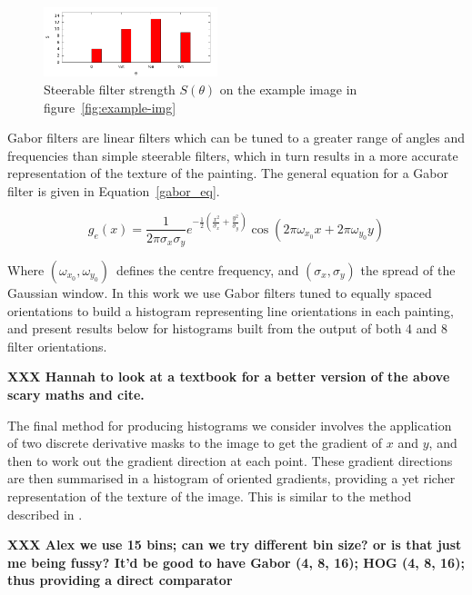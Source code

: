 \documentclass[conference,a4paper]{IEEEtran}
\begin{document}
\begin{figure}[h]
\centering
\includegraphics[width=0.45\textwidth]{img/steerable.pdf}
\caption{Steerable filter strength $S(\theta)$ on the example image in figure~\ref{fig:example-img}}
\end{figure}

Gabor filters are linear filters which can be tuned to a greater range of
angles and frequencies than simple steerable filters, which in turn results in
a more accurate representation of the texture of the painting. The general
equation for a Gabor filter is given in Equation~\ref{gabor_eq}.

\begin{equation}
g_e(x) = \frac{1}{2\pi\sigma_x \sigma_y}e^{-\frac{1}{2}\left(\frac{x^2}{\sigma_x}+\frac{y^2}{\sigma_y}\right)}\cos(2\pi\omega_{x_0}x + 2\pi\omega_{y_0}y)
\label{gabor_eq}
\end{equation}

Where $(\omega_{x_0},\omega_{y_0})$\ defines the centre frequency, and
$(\sigma_x,\sigma_y)$ the spread of the Gaussian window. In this work we use
Gabor filters tuned to equally spaced orientations to build a histogram
representing line orientations in each painting, and present results below for
histograms built from the output of both 4 and 8 filter orientations.

\textbf{XXX Hannah to look at a textbook for a better version of the above scary maths and cite.}


The final method for producing histograms we consider involves the application
of two discrete derivative masks to the image to get the gradient of $x$ and
$y$, and then to work out the gradient direction at each point. These gradient
directions are then summarised in a histogram of oriented gradients, providing
a yet richer representation of the texture of the image. This is similar to the
method described in \cite{Dalal2005Histograms}. 

\textbf{XXX Alex we use 15 bins; can we try different bin size? or is that just
me being fussy? It'd be good to have Gabor (4, 8, 16); HOG (4, 8, 16); thus
providing a direct comparator}
\end{document}
